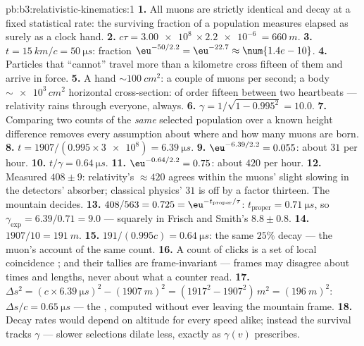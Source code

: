 \begin{solution}{pb:b3:relativistic-kinematics:1}
\textbf{1.} All muons are strictly identical and decay at a fixed
statistical rate: the surviving fraction of a population measures
elapsed  as surely as a clock hand.
\textbf{2.} $c\tau = \qty{3.00e8}{} \times \qty{2.2e-6}{} =
\qty{660}{m}$.
\textbf{3.} $t = \qty{15}{km}/c = \qty{50}{\micro s}$: fraction
$\eu^{-50/2.2} = \eu^{-22.7} \approx \num{1.4e-10}$.
\textbf{4.} Particles that ``cannot'' travel more than a kilometre
cross fifteen of them and arrive in force.
\textbf{5.} A hand $\sim\qty{100}{cm^2}$: a couple of muons per
second; a body $\sim\num{e3}\,\unit{cm^2}$ horizontal cross-section:
of order fifteen between two heartbeats --- relativity rains through
everyone, always.
\textbf{6.} $\gamma = 1/\sqrt{1 - 0.995^2} = 10.0$.
\textbf{7.} Comparing two counts of the \emph{same} selected
population over a known height difference removes every assumption
about where and how many muons are born.
\textbf{8.} $t = 1907/(0.995 \times \num{3e8}) = \qty{6.39}{\micro s}$.
\textbf{9.} $\eu^{-6.39/2.2} = 0.055$: about $31$ per hour.
\textbf{10.} $t/\gamma = \qty{0.64}{\micro s}$.
\textbf{11.} $\eu^{-0.64/2.2} = 0.75$: about $420$ per hour.
\textbf{12.} Measured $408 \pm 9$: relativity's $\approx 420$ agrees
within the muons' slight slowing in the detectors' absorber;
classical physics' $31$ is off by a factor thirteen. The mountain
decides.
\textbf{13.} $408/563 = 0.725 = \eu^{-t_{\text{proper}}/\tau}$:
$t_{\text{proper}} = \qty{0.71}{\micro s}$, so $\gamma_{\exp} =
6.39/0.71 = 9.0$ --- squarely in Frisch and Smith's $8.8 \pm 0.8$.
\textbf{14.} $1907/10 = \qty{191}{m}$.
\textbf{15.} $191/(0.995c) = \qty{0.64}{\micro s}$: the same $25\%$
decay --- the muon's account of the same count.
\textbf{16.} A count of clicks is a set of local coincidence ;
 and their tallies are frame-invariant --- frames may disagree
about times and lengths, never about what a counter read.
\textbf{17.} $\Delta s^2 = (c \times \qty{6.39}{\micro s})^2 -
(\qty{1907}{m})^2 = (1917^2 - 1907^2)\,\unit{m^2} = (\qty{196}{m})^2$:
$\Delta s/c = \qty{0.65}{\micro s}$ --- the , computed
without ever leaving the mountain frame.
\textbf{18.} Decay rates would depend on altitude for every speed
alike; instead the survival tracks $\gamma$ --- slower selections
dilate less, exactly as $\gamma(v)$ prescribes.

\end{solution}
